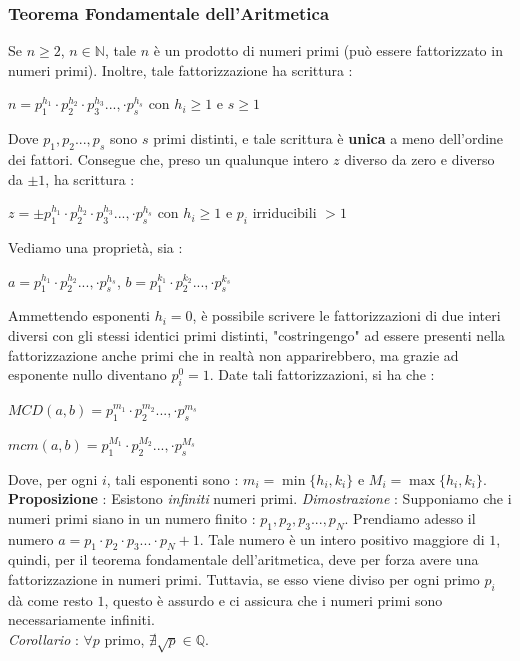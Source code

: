 \documentclass[12pt, letterpaper]{article}
\begin{document}
\subsubsection{Teorema Fondamentale dell'Aritmetica}\label{tfa}
Se \(n\ge 2\), \(n\in \mathbb{N}\), tale \(n\) è un prodotto di numeri primi (può essere fattorizzato in numeri primi).
Inoltre, tale fattorizzazione ha scrittura : \begin{center}
    \( n=p_1^{h_1}\cdot p_2^{h_2} \cdot p_3^{h_3} ...,\cdot p_s^{h_s}   \) con \(h_i\ge1\) e \(s\ge 1\)
\end{center}
Dove \(p_1,p_2...,p_s\) sono \(s\) primi distinti, e tale scrittura è \textbf{unica} a meno dell'ordine dei fattori.
Consegue che, preso un qualunque intero \(z\) diverso da zero e diverso da \(\pm1\), ha scrittura :
\begin{center}
    \( z=\pm p_1^{h_1}\cdot p_2^{h_2} \cdot p_3^{h_3} ...,\cdot p_s^{h_s}   \) con \(h_i\ge1\) e \(p_i\) irriducibili \(> 1\)
\end{center}
Vediamo una proprietà, sia : 
\begin{center}
    \(
    a=p_1^{h_1}\cdot p_2^{h_2} ...,\cdot p_s^{h_s}\),\hphantom{spacespace}   \( b=p_1^{k_1}\cdot p_2^{k_2}...,\cdot p_s^{k_s}  \) 
   
\end{center}
Ammettendo esponenti \(h_i=0\), è possibile scrivere le fattorizzazioni di due interi diversi con gli stessi 
identici primi distinti, "costringengo" ad essere presenti nella fattorizzazione anche primi che in 
realtà non apparirebbero, ma grazie ad esponente nullo diventano \(p_i^0=1\). Date tali fattorizzazioni, 
si ha che :
\begin{center}
    \(MCD(a,b)=p_1^{m_1}\cdot p_2^{m_2}...,\cdot p_s^{m_s}\)
\end{center}
\begin{center}
    \(mcm(a,b)=p_1^{M_1}\cdot p_2^{M_2}...,\cdot p_s^{M_s}\)
\end{center}
Dove, per ogni \(i\), tali esponenti sono : \(m_i=\min\{h_i,k_i\}\) e \(M_i=\max\{h_i,k_i\}\).
\\\textbf{Proposizione} : Esistono \textit{infiniti} numeri primi. \textit{Dimostrazione} : Supponiamo che i 
numeri primi siano in un numero finito : \(p_1,p_2,p_3...,p_N\). Prendiamo adesso il numero
 \(a=p_1\cdot p_2\cdot p_3...\cdot p_N+1\). Tale numero è un intero positivo maggiore di \(1\), quindi, per il 
 teorema fondamentale dell'aritmetica, deve per forza avere una fattorizzazione in numeri primi. Tuttavia, se esso 
 viene diviso per ogni primo \(p_i\) dà come resto \(1\), questo è assurdo e ci assicura che i numeri primi 
 sono necessariamente infiniti.\\
 \textit{Corollario} : \(\forall p\) primo, \(\nexists \sqrt{p}\in \mathbb{Q}\).
\end{document}

